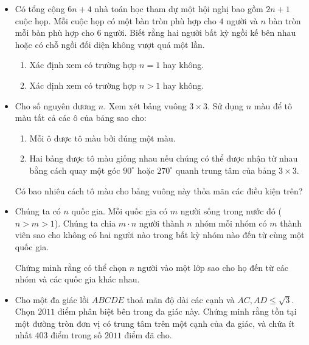 \documentclass[11pt]{scrartcl}
\begin{document}
\begin{itemize}[label=, leftmargin=0em, itemsep=-0em]
    \item \begin{btvn}
    Có tổng cộng $6n + 4$ nhà toán học tham dự một hội nghị bao gồm $2n + 1$ cuộc họp. Mỗi cuộc họp có một bàn tròn phù hợp cho $4$ người và $n$ bàn tròn mỗi bàn phù hợp cho $6$ người. Biết rằng hai người bất kỳ ngồi kế bên nhau hoặc có chỗ ngồi đối diện không vượt quá một lần.
    \begin{enumerate}[label=(\alph*)]
        \item Xác định xem có trường hợp $n = 1$ hay không.
        \item Xác định xem có trường hợp $n > 1$ hay không.
    \end{enumerate}
    \end{btvn}

    \item \begin{btvn}
        Cho số nguyên dương $n$. Xem xét bảng vuông $3 \times 3$. Sử dụng $n$ màu để tô màu tất cả các ô của bảng sao cho:
        \begin{enumerate}
            \item Mỗi ô được tô màu bởi đúng một màu.
            \item Hai bảng được tô màu giống nhau nếu chúng có thể được nhận từ nhau bằng cách quay một góc $90^\circ$ hoặc $270^\circ$ quanh trung tâm của bảng $3 \times 3$.
        \end{enumerate}
    Có bao nhiêu cách tô màu cho bảng vuông này thỏa mãn các điều kiện trên?
    \end{btvn}

    \item \begin{btvn}
        Chúng ta có $n$ quốc gia. Mỗi quốc gia có $m$ người sống trong nước đó ($n>m>1$). Chúng ta chia $m \cdot n$ người thành $n$ nhóm mỗi nhóm có $m$ thành viên sao cho không có hai người nào trong bất kỳ nhóm nào đến từ cùng một quốc gia.


        Chứng minh rằng có thể chọn $n$ người vào một lớp sao cho họ đến từ các nhóm và các quốc gia khác nhau.
    \end{btvn}

    \item \begin{btvn}
        Cho một đa giác lồi $ABCDE$ thoả mãn độ dài các cạnh và $AC, AD \leq \sqrt{3}.$ Chọn $2011$ điểm phân biệt bên trong đa giác này. Chứng minh rằng tồn tại một đường tròn đơn vị có trung tâm trên một cạnh của đa giác, và chứa ít nhất $403$ điểm trong số $2011$ điểm đã cho.


\end{btvn}
\end{itemize}
\end{document}
